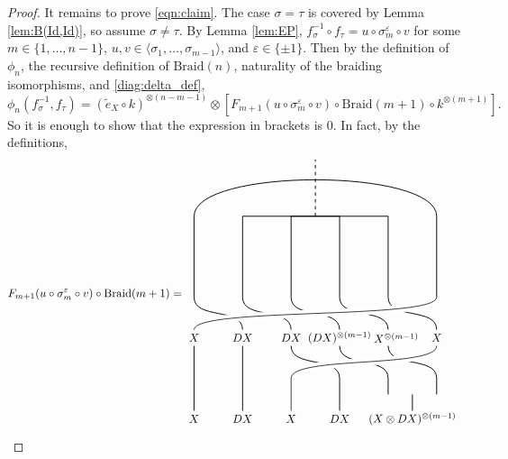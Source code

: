 \documentclass[11pt, reqno]{amsart}
\theoremstyle{definition}\newtheorem{defi}[thm]{Definition}
\theoremstyle{definition}\newtheorem{rem}[thm]{Remark}
\theoremstyle{definition}\newtheorem{exam}[thm]{Example}
\theoremstyle{definition}\newtheorem{assum}[thm]{Assumption}
\newcommand{\til}{\widetilde}
\begin{document}
\begin{proof}
It remains to prove \eqref{eqn:claim}. The case $\sigma=\tau$ is covered by Lemma \ref{lem:B(Id,Id)}, so assume $\sigma\neq\tau$. By Lemma \ref{lem:EP}, $f_\sigma^{-1}\circ f_\tau=u\circ\sigma_m^\varepsilon\circ v$ for some $m\in\lbrace 1,\ldots, n-1\rbrace$, $u,v\in\langle \sigma_1,\ldots,\sigma_{m-1}\rangle$, and $\varepsilon\in\lbrace\pm 1\rbrace$. Then by the definition of $\phi_{n}$, the recursive definition of $\mathrm{Braid}(n)$, naturality of the braiding isomorphisms, and \eqref{diag:delta_def}, 
\begin{equation*}
\phi_{n}(f_\sigma^{-1},f_\tau) = (\til{e}_X\circ k)^{\otimes (n-m-1)}\otimes\left[F_{m+1}(u\circ \sigma_m^\varepsilon\circ v)\circ\mathrm{Braid}(m+1)\circ k^{\otimes (m+1)} \right].
\end{equation*}
So it is enough to show that the expression in brackets is $0$. In fact, by the definitions,
\begin{align*}
F_{m+1}(u\circ\sigma_m^\varepsilon\circ v)\circ\mathrm{Braid}(m+1) =\begin{matrix}
    \begin{tikzpicture}[scale = 1, baseline = {(current bounding box.center)}, line width=0.75pt]
    \node at (0,-.25) {$X$};
    \node at (1.5,-.25) {$DX$};
    \node at (3,-.25) {$X$}; 
    \node at (4.5,-.25) {$DX$};
    \node at (6.75,-.25) {$(X\otimes DX)^{\otimes (m-1)}$};
    \node at (0,2.25) {$X$};
    \node at (1.5,2.25) {$DX$};
    \node at (3,2.25) {$DX$}; 
    \node at (4.5,2.25) {$(DX)^{\otimes (m-1)}$}; 
    \node at (6.25,2.25) {$X^{\otimes (m-1)}$}; 
    \node at (7.5,2.25) {$X$}; 
    \draw (4.5,0) -- (4.5,1) .. controls (4.5,1.7) and (3,1.3) .. (3,2);
    \draw (6.75,0) -- (6.75,.5);
    \draw (6,.5) -- (6,1) .. controls (6,1.7) and (4.5,1.3) .. (4.5,2);
    \draw (7.5,.5) -- (7.5,1) .. controls (7.5,1.7) and (6,1.3) .. (6,2);
    \draw[white, double=black, line width = 3pt ] (3,0) -- (3,1) .. controls (3,1.7) and (7.5,1.3) .. (7.5,2);
    \draw (0,0) -- (0,2);
    \draw (1.5,0) -- (1.5,2);
    \draw (1.5,2.5) .. controls (1.5,3.2) and (0,2.8) .. (0,3.5) -- (0,6) .. controls (0,7.5) and (7.5,7.5) .. (7.5,6) -- (7.5,3.5);
    \draw (3, 2.5) .. controls (3,3.2) and (1.5,2.8) .. (1.5,3.5) -- (1.5,6) -- (6,6) -- (6,3.5) .. controls (6,2.8) and (7.5,3.2) .. (7.5,2.5);
    \draw (4.5,2.5) .. controls (4.5,3.2) and (3,2.8) .. (3,3.5) -- (3,6) -- (4.5,6) -- (4.5,3.5) .. controls (4.5,2.8) and (6,3.2) .. (6,2.5);
    \draw[dashed] (3.75,6) -- (3.75,7.75);
     \draw[white, double=black, line width = 3pt ] (0,2.5) .. controls (0,3.2) and (7.5,2.8) .. (7.5,3.5);

\end{tikzpicture}
\end{matrix}
\end{align*}
\end{proof}
\end{document}

